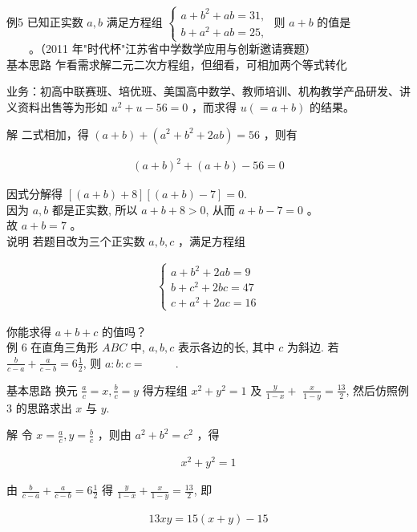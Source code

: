 \documentclass[10pt]{article}
\begin{document}
例5 已知正实数 $a, b$ 满足方程组 $\left\{\begin{array}{l}a+b^{2}+a b=31, \\ b+a^{2}+a b=25,\end{array}\right.$ 则 $a+b$ 的值是\\
$\qquad$。（2011 年"时代杯"江苏省中学数学应用与创新邀请赛题）\\
基本思路 乍看需求解二元二次方程组，但细看，可相加两个等式转化

业务：初高中联赛班、培优班、美国高中数学、教师培训、机构教学产品研发、讲义资料出售等为形如 $u^{2}+u-56=0$ ，而求得 $u(=a+b)$ 的结果。

解 二式相加，得 $(a+b)+\left(a^{2}+b^{2}+2 a b\right)=56$ ，则有

\begin{align*}
(a+b)^{2}+(a+b)-56=0
\end{align*}

因式分解得 $[(a+b)+8][(a+b)-7]=0$.\\
因为 $a, b$ 都是正实数, 所以 $a+b+8>0$, 从而 $a+b-7=0$ 。\\
故 $a+b=7$ 。\\
说明 若题目改为三个正实数 $a, b, c$ ，满足方程组

\begin{align*}
\left\{\begin{array}{l}
a+b^{2}+2 a b=9 \\
b+c^{2}+2 b c=47 \\
c+a^{2}+2 a c=16
\end{array}\right.
\end{align*}

你能求得 $a+b+c$ 的值吗？\\
例 6 在直角三角形 $A B C$ 中, $a, b, c$ 表示各边的长, 其中 $c$ 为斜边. 若 $\frac{b}{c-a}+\frac{a}{c-b}=6 \frac{1}{2}$, 则 $a: b: c=$ $\qquad$ .

基本思路 换元 $\frac{a}{c}=x, \frac{b}{c}=y$ 得方程组 $x^{2}+y^{2}=1$ 及 $\frac{y}{1-x}+$ $\frac{x}{1-y}=\frac{13}{2}$, 然后仿照例 3 的思路求出 $x$ 与 $y$.

解 令 $x=\frac{a}{c}, y=\frac{b}{c}$ ，则由 $a^{2}+b^{2}=c^{2}$ ，得

\begin{align*}
x^{2}+y^{2}=1 \tag{1}
\end{align*}

由 $\frac{b}{c-a}+\frac{a}{c-b}=6 \frac{1}{2}$ 得 $\frac{y}{1-x}+\frac{x}{1-y}=\frac{13}{2}$, 即

\begin{align*}
13 x y=15(x+y)-15 \tag{2}
\end{align*}
\end{document}
